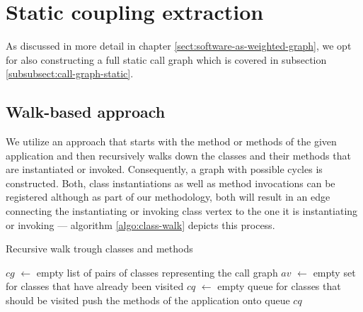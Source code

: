 \documentclass[12pt,a4paper]{report}
\begin{document}
\section{Static coupling extraction} \label{sect:static-coupling-extraction}

As discussed in more detail in chapter \ref{sect:software-as-weighted-graph},
we opt for also constructing a full static call graph which is covered
in subsection \ref{subsubsect:call-graph-static}.


\subsection{Walk\hyp based approach}

We utilize an approach that starts with the  method or methods of
the given application and then recursively walks down the classes and their
methods that are instantiated or invoked. Consequently, a graph with
possible cycles is constructed.
Both, class instantiations as well as method invocations can be registered
although as part of our methodology, both  will result in an edge connecting
the instantiating or invoking class vertex to the one it is instantiating
or invoking --- algorithm \ref{algo:class-walk} depicts this process.

\begin{algorithm}[ht]
\caption{Recursive walk trough classes and methods}
\label{algo:class-walk}
  \BlankLine
  \BlankLine
  $cg$ $\leftarrow$ empty list of pairs of classes representing the call graph\;
  $av$ $\leftarrow$ empty set for classes that have already been visited\;
  $cq$ $\leftarrow$ empty queue for classes that should be visited\;
  \BlankLine
  push the  methods of the application onto queue $cq$\;
  \BlankLine
  \BlankLine
  \;
\end{algorithm}
\end{document}
